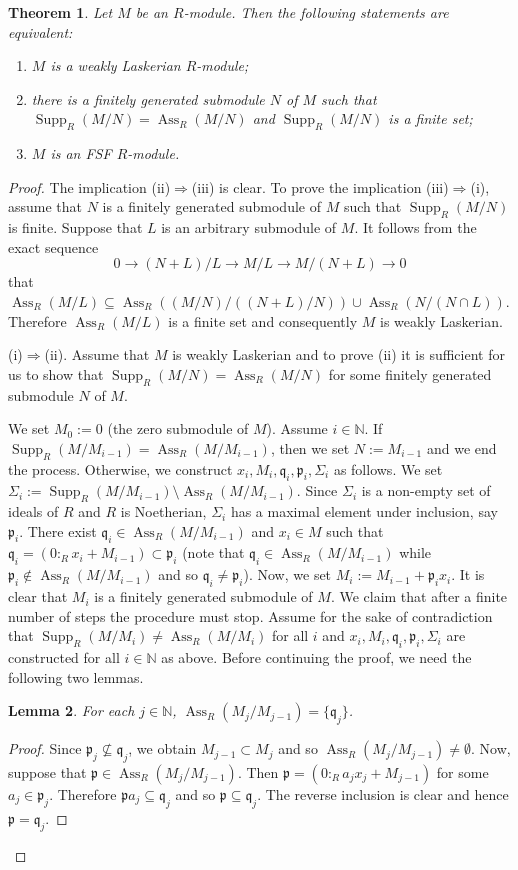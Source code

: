 \documentclass{amsart}
\newtheorem{thm}{Theorem}[section]
\newtheorem{lem}[thm]{Lemma}
\theoremstyle{definition}
\numberwithin{equation}{section}
\newcommand\supp {\operatorname{Supp}}
\newcommand\ass {\operatorname{Ass}}
\newcommand\fp{\mathfrak p}
\newcommand\fq{\mathfrak q}
\newcommand\N{\mathbb N}
\begin{document}
\begin{thm}Let $M$ be an $R$-module. Then the following statements are equivalent:
\begin{enumerate}[\rm(i)]
\item $M$ is a weakly Laskerian $R$-module;
\item there is a finitely generated submodule $N$ of $M$ such that $\supp_R(M/N)=\ass_R(M/N)$ and $\supp_R(M/N)$ is a finite set;
\item $M$ is an FSF $R$-module.
\end{enumerate}
\end{thm}
\begin{proof}
The implication (ii)$\Rightarrow$(iii) is clear. To prove the implication (iii)$\Rightarrow$(i), assume that $N$ is a finitely generated submodule  of $M$ such that $\supp_R(M/N)$ is finite. Suppose that $L$ is an arbitrary submodule of $M$. It follows from the exact sequence
$$0\rightarrow(N+L)/L\rightarrow M/L\rightarrow M/(N+L)\rightarrow 0$$
that $\ass_R(M/L)\subseteq\ass_R((M/N)/((N+L)/N))\cup\ass_R(N/(N\cap L))$. Therefore  $\ass_R(M/L)$ is a finite set and consequently $M$ is weakly Laskerian.

(i)$\Rightarrow$(ii). Assume that $M$ is weakly Laskerian and to prove (ii) it is sufficient for us to show that  $\supp_R(M/N)=\ass_R(M/N)$ for some finitely generated submodule $N$ of $M$.

We set  $M_0:=0$ (the zero submodule of $M$). Assume $i\in\N$.  If $\supp_R(M/M_{i-1})=\ass_R(M/M_{i-1})$, then we set $N:=M_{i-1}$ and we end the process.  Otherwise,  we construct $x_i, M_i,  \fq_i, \fp_i, \Sigma_i$ as follows. We set $\Sigma_i:=\supp_R(M/M_{i-1})\setminus\ass_R(M/M_{i-1})$. Since $\Sigma_i$ is a non-empty set of ideals of $R$ and $R$ is Noetherian,  $\Sigma_i$ has a maximal element under inclusion, say  $\fp_i$.
  There exist $\fq_i\in\ass_R(M/M_{i-1})$ and $x_i\in M$ such that $\fq_i=(0:_Rx_i+M_{i-1})\subset\fp_i$ (note that $\fq_i\in\ass_R(M/M_{i-1})$ while $\fp_i\notin\ass_R(M/M_{i-1})$ and so $\fq_i\neq\fp_i$). Now, we  set $M_i:=M_{i-1}+\fp_ix_i$. It is clear that $M_i$ is a finitely generated submodule of $M$. We claim that after a finite number of steps the procedure must stop.  Assume for the sake of contradiction that $\supp_R(M/M_i)\neq\ass_R(M/M_i)$ for all $i$ and $x_i, M_i,  \fq_i, \fp_i, \Sigma_i$ are constructed for all $i\in\N$ as above. Before continuing the proof, we need the following two lemmas.

  \begin{lem}\label{lem1} For each $ j\in \N$, $\ass_R(M_j/M_{j-1})=\{\fq_j\}$.
  \end{lem}
  \begin{proof}
  Since $\fp_j\nsubseteq\fq_j$, we obtain $M_{j-1}\subset M_j$ and so $\ass_R(M_j/M_{j-1})\neq\emptyset$. Now, suppose that  $\fp\in\ass_R(M_j/M_{j-1})$. Then $\fp=(0:_Ra_jx_j+M_{j-1})$ for some $a_j\in\fp_j$. Therefore
   $\fp a_j\subseteq\fq_j$ and so $\fp\subseteq \fq_j$. The reverse inclusion is clear and hence  $\fp=\fq_j$.
  \end{proof}


\end{proof}
\end{document}
